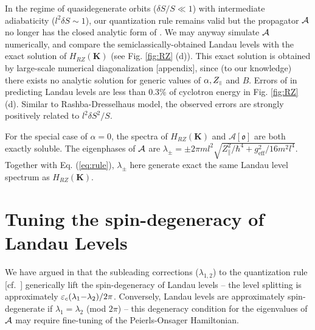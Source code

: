 \documentclass[aps, prb, showpacs, twocolumn, notitlepage, superscriptaddress]{revtex4-1}
\begin{document}
In the regime of quasidegenerate orbits ($\delta S/S \ll 1$) with intermediate adiabaticity ($l^2\delta S\sim 1$),  our quantization rule  remains valid but the propagator ${\cal A}$ no longer has the closed analytic form of . We may anyway simulate ${\cal A}$ numerically, and compare the semiclassically-obtained Landau levels with the exact solution of $H_{RZ}(\boldsymbol{K})$ (see Fig. \ref{fig:RZ} (d)). This exact solution is obtained by large-scale numerical diagonalization [appendix], since (to our knowledge) there exists no analytic solution for generic values of $\alpha,Z_{\scriptscriptstyle{\parallel}}$ and $B$. Errors of  in predicting Landau levels are less than 0.3\% of cyclotron energy in Fig. \ref{fig:RZ} (d). Similar to Rashba-Dresselhaus model, the observed errors are strongly positively related to $l^2\delta S^2/S$.


For the special case of $\alpha=0$, the spectra of $H_{RZ}(\boldsymbol{K})$ and $\mathcal{A}[\mathfrak{o}]$ are both exactly soluble. The eigenphases of ${\cal A}$ are $\lambda_{\pm}=\pm 2\pi ml^2\sqrt{Z_\parallel^2/\hbar^4+g_\text{eff}^2/16m^2l^4}$. Together with Eq. (\ref{eq:rule}), $\lambda_\pm$ here generate exact the same Landau level spectrum as $H_{RZ}(\boldsymbol{K})$.






\section{Tuning the spin-degeneracy of Landau Levels}\label{sec:llquasideg}

We have argued in  that the subleading corrections ($\lambda_{1,2}$) to the quantization rule [cf.\ ] generically lift the spin-degeneracy of Landau levels -- the level splitting is approximately $\varepsilon_c(\lambda_1{-}\lambda_2)/2\pi$. Conversely, Landau levels are approximately spin-degenerate if $\lambda_1{=}\lambda_2$ (mod $2\pi$) -- this degeneracy condition for the eigenvalues of ${\cal A}$ may require fine-tuning of the Peierls-Onsager Hamiltonian.  
\end{document}
